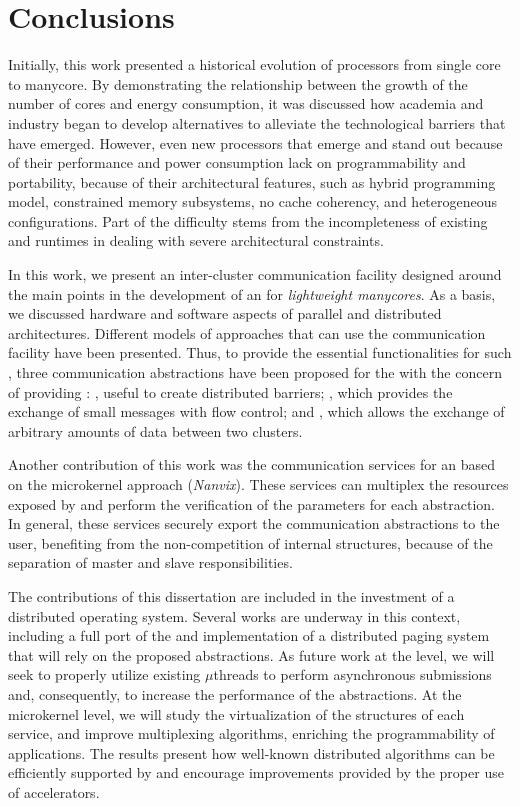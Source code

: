 \chapter{Conclusions}
\label{ch.conclusions}

	Initially, this work presented a historical evolution of processors from single core
    to manycore. By demonstrating the relationship between the growth of the
    number of cores and energy consumption, it was discussed how academia and
    industry began to develop alternatives to alleviate the technological barriers
    that have emerged. However, even new processors that emerge and stand out
    because of their performance and power consumption lack on programmability
    and portability, because of their architectural features, such as hybrid
    programming model, constrained memory subsystems, no cache coherency, and
    heterogeneous configurations. Part of the difficulty stems from the
    incompleteness of existing \oss and runtimes in dealing with severe
    architectural constraints.

	In this work, we present an inter-cluster communication facility designed
    around the main points in the development of an \os for
    \textit{lightweight manycores}. As a basis, we discussed hardware and software
    aspects of parallel and distributed architectures. Different models of
    \os approaches that can use the communication facility have been presented.
    Thus, to provide the essential functionalities for such \oss, three
    communication abstractions have been proposed for the \nanvixhal with the concern of
    providing \qos: \sync, useful to create distributed
    barriers; \mailbox, which provides the exchange of small messages
    with flow control; and \portal, which allows the exchange
    of arbitrary amounts of data between two clusters.

	Another contribution of this work was the communication services for an \os
    based on the microkernel approach (\textit{Nanvix}). These services can multiplex
    the resources exposed by \hal and perform the verification of the parameters for
    each abstraction. In general, these services securely export the communication
    abstractions to the user, benefiting from the non-competition of \os internal
    structures, because of the separation of master and slave responsibilities.

	The contributions of this dissertation are included in the investment of a
    distributed operating system. Several works are underway in this context,
    including a full port of the \mpi and implementation of a distributed paging
    system that will rely on the proposed abstractions. As future work at the \hal level, we will
    seek to properly utilize existing \dma $\mu$threads to perform asynchronous
    submissions and, consequently, to increase the performance of the abstractions. At
    the microkernel level, we will study the virtualization of the structures of
    each service, and improve multiplexing algorithms, enriching the
    programmability of applications. The results present how well-known
    distributed algorithms can be efficiently supported by \nanvixos and
    encourage improvements provided by the proper use of \dma accelerators.